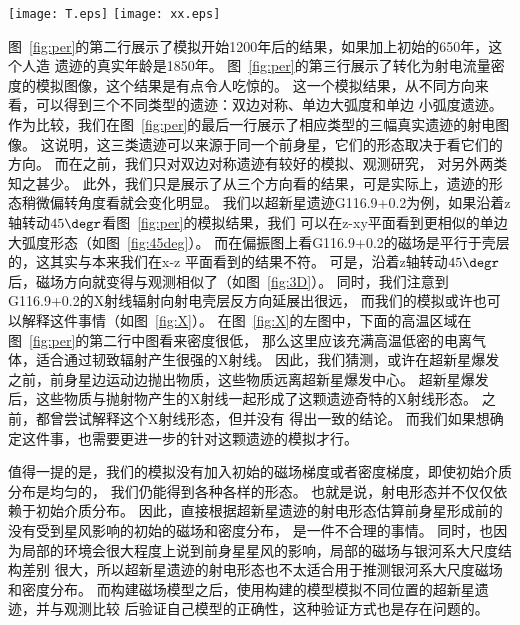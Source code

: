 \begin{figure*}
    \centering
    \texttt{[image: T.eps]}
    \texttt{[image: xx.eps]}
    \caption{\textit{左图:}x-z平面的相对温度分布。\textit{右图:} ASCA (Advanced Satellite for
    Cosmology and Astrophysics)望远镜观测到的G116.9+0.2的X图像G116.9+0.2，外加CGPS
     (Canadian Galactic Plane Survey)巡天的射电图像等高线\citep{Pannuti2010}。}
\label{fig:X}
\end{figure*}

图~\ref{fig:per}的第二行展示了模拟开始1200年后的结果，如果加上初始的650年，这个人造
遗迹的真实年龄是1850年。
图~\ref{fig:per}的第三行展示了转化为射电流量密度的模拟图像，这个结果是有点令人吃惊的。
这一个模拟结果，从不同方向来看，可以得到三个不同类型的遗迹：双边对称、单边大弧度和单边
小弧度遗迹。
作为比较，我们在图~\ref{fig:per}的最后一行展示了相应类型的三幅真实遗迹的射电图像。
这说明，这三类遗迹可以来源于同一个前身星，它们的形态取决于看它们的方向。
而在之前，我们只对双边对称遗迹有较好的模拟、观测研究\citep{Gaensler1999,Petruk2009a}，
对另外两类知之甚少。
此外，我们只是展示了从三个方向看的结果，可是实际上，遗迹的形态稍微偏转角度看就会变化明显。
我们以超新星遗迹G116.9+0.2为例，如果沿着z轴转动$45\degr$看图~\ref{fig:per}的模拟结果，我们
可以在z-xy平面看到更相似的单边大弧度形态（如图~\ref{fig:45deg}）。
而在偏振图上看G116.9+0.2的磁场是平行于壳层的\citep{Sun2011}，这其实与本来我们在x-z
平面看到的结果不符。
可是，沿着z轴转动$45\degr$后，磁场方向就变得与观测相似了（如图~\ref{fig:3D}）。
同时，我们注意到G116.9+0.2的X射线辐射向射电壳层反方向延展出很远\citep{Pannuti2010}，
而我们的模拟或许也可以解释这件事情（如图~\ref{fig:X}）。
在图~\ref{fig:X}的左图中，下面的高温区域在图~\ref{fig:per}的第二行中图看来密度很低，
那么这里应该充满高温低密的电离气体，适合通过韧致辐射产生很强的X射线。
因此，我们猜测，或许在超新星爆发之前，前身星边运动边抛出物质，这些物质远离超新星爆发中心。
超新星爆发后，这些物质与抛射物产生的X射线一起形成了这颗遗迹奇特的X射线形态。
之前，\citet{Craig1997,Yar-Uyaniker2004,West2016}都曾尝试解释这个X射线形态，但并没有
得出一致的结论。
而我们如果想确定这件事，也需要更进一步的针对这颗遗迹的模拟才行。

值得一提的是，我们的模拟没有加入初始的磁场梯度或者密度梯度，即使初始介质分布是均匀的，
我们仍能得到各种各样的形态。
也就是说，射电形态并不仅仅依赖于初始介质分布。
因此，直接根据超新星遗迹的射电形态估算前身星形成前的没有受到星风影响的初始的磁场和密度分布，
是一件不合理的事情。
同时，也因为局部的环境会很大程度上说到前身星星风的影响，局部的磁场与银河系大尺度结构差别
很大，所以超新星遗迹的射电形态也不太适合用于推测银河系大尺度磁场和密度分布。
而\citet{West2016}构建磁场模型之后，使用构建的模型模拟不同位置的超新星遗迹，并与观测比较
后验证自己模型的正确性，这种验证方式也是存在问题的。

